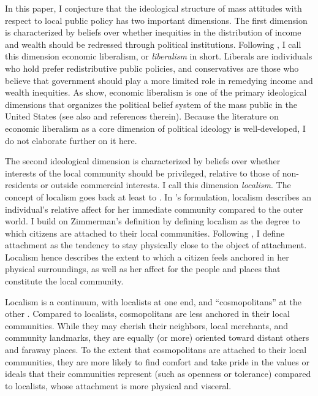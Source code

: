 \documentclass[article,11pt]{memoir}
\begin{document}
In this paper, I conjecture that the ideological structure of mass attitudes with respect to local public policy has two important dimensions. The first dimension is characterized by beliefs over whether inequities in the distribution of income and wealth should be redressed through political institutions. Following \cite{treier_nature_2009}, I call this dimension economic liberalism, or \emph{liberalism} in short. Liberals are individuals who hold prefer redistributive public policies, and conservatives are those who believe that government should play a more limited role in remedying income and wealth inequities.  As \cite{treier_nature_2009} show, economic liberalism is one of the primary ideological dimensions that organizes the political belief system of the mass public in the United States (see also \cite{feldman_understanding_2014} and references therein). Because the literature on economic liberalism as a core dimension of political ideology is well-developed, I do not elaborate further on it here.

The second ideological dimension is characterized by beliefs over whether interests of the local community should be privileged, relative to those of non-residents or outside commercial interests.  I call this dimension \emph{localism}.  The concept of localism goes back at least to \cite{zimmerman_centralism_1938}. In \citeauthor{zimmerman_centralism_1938}'s formulation, localism describes an individual's relative affect for her immediate community compared to the outer world. I build on Zimmerman's definition by defining localism as the degree to which citizens are attached to their local communities.  Following \cite{hidalgo_place_2001}, I define attachment as the tendency to stay physically close to the object of attachment.  Localism hence describes the extent to which a citizen feels anchored in her physical surroundings, as well as her affect for the people and places that constitute the local community.  

Localism is a continuum, with localists at one end, and ``cosmopolitans'' at the other \citep{dye_local-cosmopolitan_1963-1,merton_social_1968}. Compared to localists, cosmopolitans are less anchored in their local communities. While they may cherish their neighbors, local merchants, and community landmarks, they are equally (or more) oriented toward distant others and faraway places. To the extent that cosmopolitans are attached to their local communities, they are more likely to find comfort and take pride in the values or ideals that their communities represent (such as openness or tolerance) compared to localists, whose attachment is more physical and visceral.
\end{document}
